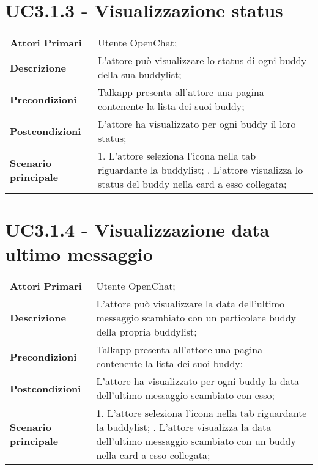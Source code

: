 \section{UC3.1.3 - Visualizzazione status}
	\begin{center}
		\bgroup
		\def\arraystretch{1.8}     
		\begin{longtable}{  p{4cm} | p{9.5cm} } 
			\textbf{Attori Primari} & Utente OpenChat; \\ 
			\textbf{Descrizione} &  L'attore può visualizzare lo status di ogni buddy della sua buddylist; \\ 
			\textbf{Precondizioni}  & Talkapp presenta all'attore una pagina contenente la lista dei suoi buddy; \\
			\textbf{Postcondizioni} & L'attore ha visualizzato per ogni buddy  il loro status;  \\ 
			\textbf{Scenario principale} & 
			1. L'attore seleziona l'icona nella tab riguardante la buddylist; \newline
			2. L'attore visualizza lo status del buddy nella card a esso collegata;
		\end{longtable}
		\egroup
	\end{center}
\section{UC3.1.4 - Visualizzazione data ultimo messaggio}
	\begin{center}
		\bgroup
		\def\arraystretch{1.8}     
		\begin{longtable}{  p{4cm} | p{9.5cm} } 
			\textbf{Attori Primari} & Utente OpenChat; \\ 
			\textbf{Descrizione} &  L'attore può visualizzare la data dell'ultimo messaggio scambiato con un particolare buddy della propria buddylist; \\ 
			\textbf{Precondizioni}  & Talkapp presenta all'attore una pagina contenente la lista dei suoi buddy; \\
			\textbf{Postcondizioni} & L'attore ha visualizzato per ogni buddy  la data dell'ultimo messaggio scambiato con esso;  \\ 
			\textbf{Scenario principale} & 
			1. L'attore seleziona l'icona nella tab riguardante la buddylist; \newline
			2. L'attore visualizza la data dell'ultimo messaggio scambiato con un buddy nella card a esso collegata;
		\end{longtable}
		\egroup
	\end{center}
